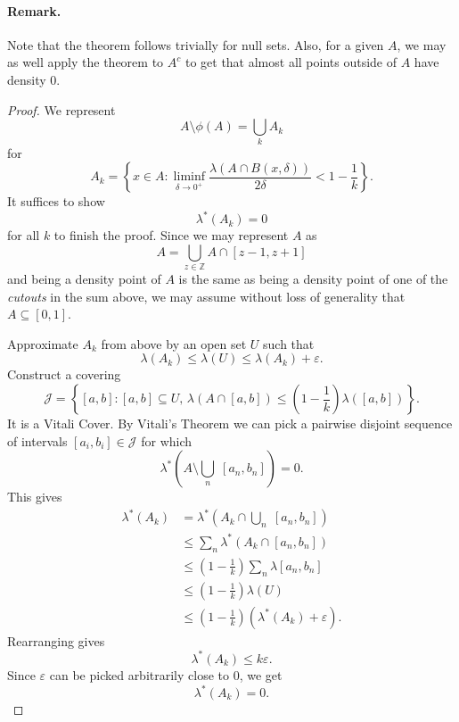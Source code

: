 \paragraph{Remark.} Note that the theorem follows trivially for null sets. Also, for a given \( A \), we may as well apply the theorem to \( A^c \) to get that almost all points outside of \( A \) have density \( 0 \).
\begin{proof}
    We represent
    \[ 
    A \setminus \phi(A) = \bigcup_k A_k      
   \]
   for
   \[ 
       A_k = \left\{ x \in A : \liminf_{\delta \to 0^+} \frac{\lambda(A \cap B(x,\delta))}{2\delta} < 1 - \frac{1}{k} \right\}.
  \]
  It suffices to show
  \[ 
     \lambda^*(A_k) = 0 
 \]
 for all \( k \) to finish the proof. Since we may represent \( A \) as
 \[ 
     A = \bigcup_{z \in \mathbb{Z}} A \cap [z-1, z+1] 
\]
and being a density point of \( A \) is the same as being a density point of one of the \emph{cutouts} in the sum above, we may assume without loss of generality that \( A \subseteq [0,1] \).

Approximate \( A_k \) from above by an open set \( U \) such that
\[ 
    \lambda(A_k) \leqslant \lambda(U) \leqslant \lambda(A_k) + \varepsilon.
\]
Construct a covering
\[ 
    \mathcal{J} = \left\{ [a,b] : [a,b] \subseteq U,\,\lambda(A \cap [a,b]) \leqslant \left(1 - \frac{1}{k}\right)\lambda([a,b])\right\}.
\]
It is a Vitali Cover. By Vitali's Theorem we can pick a pairwise disjoint sequence of intervals \( [a_i, b_i] \in \mathcal{J}\) for which
\[ 
    \lambda^*\left( A \setminus \bigcup_n\; [a_n, b_n]\right) = 0.
\]
This gives
\begin{align*}
    \lambda^* (A_k) &=\lambda^*\left(A_k \cap \bigcup_n \; [a_n, b_n] \right) \\
                    &\leqslant \sum_n \lambda^*(A_k \cap [a_n, b_n] ) \\
                    &\leqslant \left( 1 - \frac{1}{k} \right) \sum_n\lambda[a_n, b_n] \\
                    &\leqslant \left( 1 - \frac{1}{k} \right)\lambda(U) \\
                    &\leqslant \left( 1 - \frac{1}{k} \right) \left(\lambda^*(A_k) +\varepsilon \right).
\end{align*}
Rearranging gives
\[ 
   \lambda^*(A_k) \leqslant k\varepsilon. 
\]
Since \(\varepsilon \) can be picked arbitrarily close to 0, we get
\[ 
   \lambda^*(A_k) = 0. 
\]

\end{proof}



